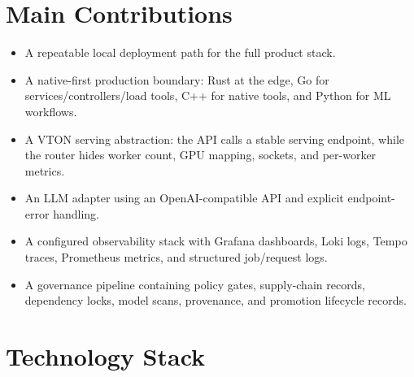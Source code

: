 \documentclass[12pt,a4paper,oneside]{report}
\begin{document}
\section{Main Contributions}

\begin{itemize}
  \item A repeatable local deployment path for the full product stack.
  \item A native-first production boundary: Rust at the edge, Go for services/controllers/load tools, C++ for native tools, and Python for ML workflows.
  \item A VTON serving abstraction: the API calls a stable serving endpoint, while the router hides worker count, GPU mapping, sockets, and per-worker metrics.
  \item An LLM adapter using an OpenAI-compatible API and explicit endpoint-error handling.
  \item A configured observability stack with Grafana dashboards, Loki logs, Tempo traces, Prometheus metrics, and structured job/request logs.
  \item A governance pipeline containing policy gates, supply-chain records, dependency locks, model scans, provenance, and promotion lifecycle records.
\end{itemize}

\section{Technology Stack}
\end{document}
